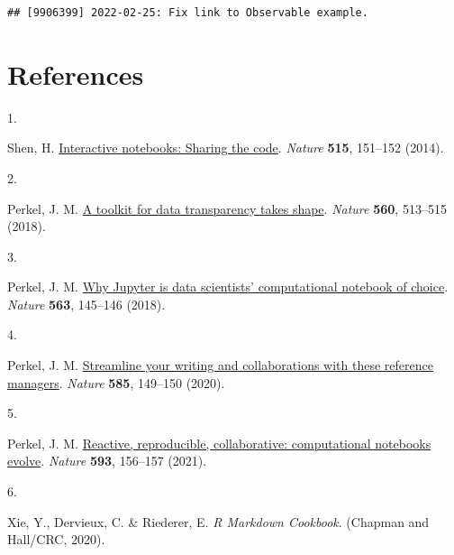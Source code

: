 \documentclass[smallextended]{svjour3}       %
\newlength{\cslhangindent}
\newlength{\csllabelwidth}
\newlength{\cslentryspacingunit} %
\newenvironment{CSLReferences}[2] %
 {%
  \setlength{\parindent}{0pt}
  \ifodd #1
  \let\oldpar\par
  \def\par{\hangindent=\cslhangindent\oldpar}
  \fi
  \setlength{\parskip}{#2\cslentryspacingunit}
 }%
 {}
\newcommand{\CSLLeftMargin}[1]{\parbox[t]{\csllabelwidth}{#1}}
\newcommand{\CSLRightInline}[1]{\parbox[t]{\linewidth - \csllabelwidth}{#1}\break}
\begin{document}
\begin{verbatim}
## [9906399] 2022-02-25: Fix link to Observable example.
\end{verbatim}

\hypertarget{references}{%
\section*{References}\label{references}}

\hypertarget{refs}{}
\begin{CSLReferences}{0}{0}
\leavevmode{}%
\CSLLeftMargin{1. }
\CSLRightInline{Shen, H. \href{https://doi.org/10.1038/515151a}{Interactive notebooks: Sharing the code}. \emph{Nature} \textbf{515}, 151--152 (2014).}

\leavevmode{}%
\CSLLeftMargin{2. }
\CSLRightInline{Perkel, J. M. \href{https://doi.org/10.1038/d41586-018-05990-5}{A toolkit for data transparency takes shape}. \emph{Nature} \textbf{560}, 513--515 (2018).}

\leavevmode{}%
\CSLLeftMargin{3. }
\CSLRightInline{Perkel, J. M. \href{https://doi.org/10.1038/d41586-018-07196-1}{Why Jupyter is data scientists{'} computational notebook of choice}. \emph{Nature} \textbf{563}, 145--146 (2018).}

\leavevmode{}%
\CSLLeftMargin{4. }
\CSLRightInline{Perkel, J. M. \href{https://doi.org/10.1038/d41586-020-02491-2}{Streamline your writing {\textemdash} and collaborations {\textemdash} with these reference managers}. \emph{Nature} \textbf{585}, 149--150 (2020).}

\leavevmode{}%
\CSLLeftMargin{5. }
\CSLRightInline{Perkel, J. M. \href{https://doi.org/10.1038/d41586-021-01174-w}{Reactive, reproducible, collaborative: computational notebooks evolve}. \emph{Nature} \textbf{593}, 156--157 (2021).}

\leavevmode{}%
\CSLLeftMargin{6. }
\CSLRightInline{Xie, Y., Dervieux, C. \& Riederer, E. \emph{R {Markdown Cookbook}}. ({Chapman and Hall/CRC}, 2020).}

\end{CSLReferences}




\end{document}
